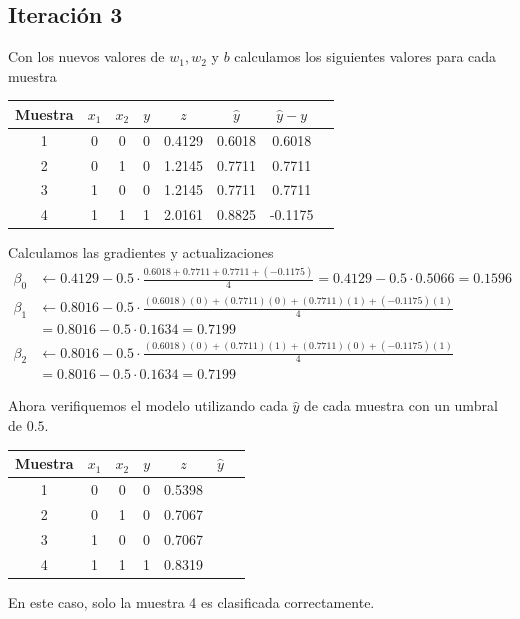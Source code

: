 \subsection*{Iteración 3}
Con los nuevos valores de $w_1, w_2$ y $b$ calculamos los siguientes valores para cada muestra
\begin{center}
    \begin{tabular}{c||c|c|c|c|c|c|c}
        Muestra &$x_1$ & $x_2$ & $y$ & $z$ & $\hat{y}$ & $\hat{y} - y$ \\
        \hline
        1&0 & 0 & 0 & 0.4129 & 0.6018 & 0.6018 \\
        2&0 & 1 & 0 & 1.2145 & 0.7711 & 0.7711 \\
        3&1 & 0 & 0 & 1.2145 & 0.7711 & 0.7711 \\
        4&1 & 1 & 1 & 2.0161 & 0.8825 & -0.1175
    \end{tabular}
\end{center}

Calculamos las gradientes y actualizaciones
\begin{align*}
    \beta_0 &\gets 0.4129 - 0.5 \cdot \frac{0.6018 + 0.7711 + 0.7711 + (- 0.1175)}{4} = 0.4129 - 0.5 \cdot 0.5066 = 0.1596 \\
    \beta_1 &\gets 0.8016 - 0.5 \cdot \frac{(0.6018)(0) + (0.7711)(0) + (0.7711)(1) + (-0.1175)(1)}{4}\\
    & = 0.8016 - 0.5 \cdot 0.1634 = 0.7199 \\
    \beta_2 &\gets 0.8016 - 0.5 \cdot \frac{(0.6018)(0) + (0.7711)(1) + (0.7711)(0) + (-0.1175)(1)}{4} \\
    & = 0.8016 - 0.5 \cdot 0.1634 = 0.7199
\end{align*}

Ahora verifiquemos el modelo utilizando cada $\hat{y}$ de cada muestra con un umbral de $0.5$.

\begin{center}
    \begin{tabular}{c||c|c|c|c|c|c}
        Muestra &$x_1$ & $x_2$ & $y$ & $z$ & $\hat{y}$ \\
        \hline
        1&0 & 0 & 0 & 0.5398\\
        2&0 & 1 & 0 & 0.7067\\
        3&1 & 0 & 0 & 0.7067\\
        4&1 & 1 & 1 & 0.8319\\
    \end{tabular}
\end{center}

En este caso, solo la muestra 4 es clasificada correctamente.